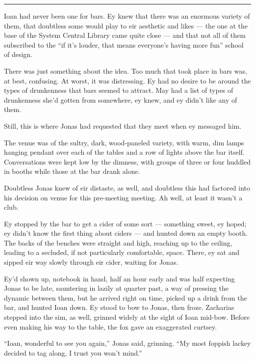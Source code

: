 \begin{center}\rule{0.5\linewidth}{0.5pt}\end{center}

Ioan had never been one for bars. Ey knew that there was an enormous variety of them, that doubtless some would play to eir aesthetic and likes — the one at the base of the System Central Library came quite close — and that not all of them subscribed to the ``if it's louder, that means everyone's having more fun'' school of design.

There was just something about the idea. Too much that took place in bars was, at best, confusing. At worst, it was distressing. Ey had no desire to be around the types of drunkenness that bars seemed to attract. May had a list of types of drunkenness she'd gotten from somewhere, ey knew, and ey didn't like any of them.

Still, this is where Jonas had requested that they meet when ey messaged him.

The venue was of the sultry, dark, wood-paneled variety, with warm, dim lamps hanging pendant over each of the tables and a row of lights above the bar itself. Conversations were kept low by the dimness, with groups of three or four huddled in booths while those at the bar drank alone.

Doubtless Jonas knew of eir distaste, as well, and doubtless this had factored into his decision on venue for this pre-meeting meeting. Ah well, at least it wasn't a club.

Ey stopped by the bar to get a cider of some sort — something sweet, ey hoped; ey didn't know the first thing about ciders — and hunted down an empty booth. The backs of the benches were straight and high, reaching up to the ceiling, leading to a secluded, if not particularly comfortable, space. There, ey sat and sipped eir way slowly through eir cider, waiting for Jonas.

Ey'd shown up, notebook in hand, half an hour early and was half expecting Jonas to be late, sauntering in lazily at quarter past, a way of pressing the dynamic between them, but he arrived right on time, picked up a drink from the bar, and hunted Ioan down. Ey stood to bow to Jonas, then froze. Zacharias stepped into the sim, as well, grinned widely at the sight of Ioan mid-bow. Before even making his way to the table, the fox gave an exaggerated curtsey.

``Ioan, wonderful to see you again,'' Jonas said, grinning. ``My most foppish lackey decided to tag along, I trust you won't mind.''

